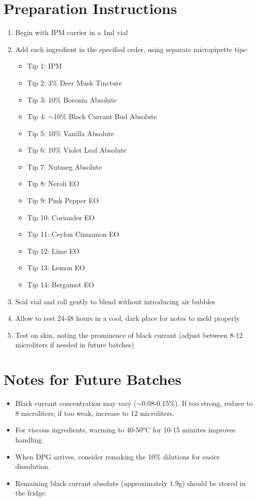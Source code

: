 \documentclass{article}
\begin{document}
\section*{Preparation Instructions}
\begin{enumerate}
  \item Begin with IPM carrier in a 1ml vial
  \item Add each ingredient in the specified order, using separate micropipette tips:
  \begin{itemize}
    \item Tip 1: IPM
    \item Tip 2: 3\% Deer Musk Tincture
    \item Tip 3: 10\% Boronia Absolute
    \item Tip 4: $\sim$10\% Black Currant Bud Absolute
    \item Tip 5: 10\% Vanilla Absolute
    \item Tip 6: 10\% Violet Leaf Absolute
    \item Tip 7: Nutmeg Absolute
    \item Tip 8: Neroli EO
    \item Tip 9: Pink Pepper EO
    \item Tip 10: Coriander EO
    \item Tip 11: Ceylon Cinnamon EO
    \item Tip 12: Lime EO
    \item Tip 13: Lemon EO
    \item Tip 14: Bergamot EO
  \end{itemize}
  \item Seal vial and roll gently to blend without introducing air bubbles
  \item Allow to rest 24-48 hours in a cool, dark place for notes to meld properly
  \item Test on skin, noting the prominence of black currant (adjust between 8-12 microliters if needed in future batches)
\end{enumerate}

\section*{Notes for Future Batches}
\begin{itemize}
  \item Black currant concentration may vary ($\sim$0.08-0.15\%). If too strong, reduce to 8 microliters; if too weak, increase to 12 microliters.
  \item For viscous ingredients, warming to 40-50°C for 10-15 minutes improves handling.
  \item When DPG arrives, consider remaking the 10\% dilutions for easier dissolution.
  \item Remaining black currant absolute (approximately 1.9g) should be stored in the fridge.
\end{itemize}
\end{document}

